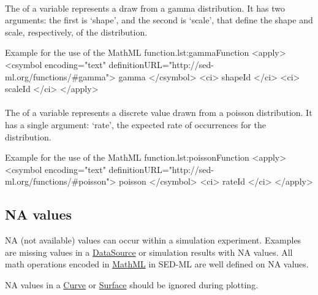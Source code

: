 \begin{blockChanged}

\paragraph*{}
\label{fun:gamma}
The \sedgamma of a variable represents a draw from a gamma distribution.  It has two arguments:  the first is `shape', and the second is `scale', that define the shape and scale, respectively, of the distribution.
\begin{myXmlLst}{Example for the use of the MathML  function.}{lst:gammaFunction}
<apply>
 	<csymbol encoding="text" definitionURL="http://sed-ml.org/functions/#gamma">
 		gamma
 	</csymbol>
 	<ci> shapeId </ci>
 	<ci> scaleId </ci>
</apply>
\end{myXmlLst}

\paragraph*{}
\label{fun:poisson}
The \poisson of a variable represents a discrete value drawn from a poisson distribution.  It has a single argument:  `rate', the expected rate of occurrences for the distribution.
\begin{myXmlLst}{Example for the use of the MathML  function.}{lst:poissonFunction}
<apply>
 	<csymbol encoding="text" definitionURL="http://sed-ml.org/functions/#poisson">
 		poisson
 	</csymbol>
 	<ci> rateId </ci>
</apply>
\end{myXmlLst}

\end{blockChanged}



\subsection{NA values}
NA (not available) values can occur within a simulation experiment. Examples are missing values in a \hyperref[class:dataSource]{DataSource} or simulation results with NA values. All math operations encoded in \hyperref[sec:mathML]{MathML} in SED-ML are well defined on NA values. 

NA values in a \hyperref[class:curve]{Curve} or \hyperref[class:surface]{Surface} should be ignored during plotting.
  
